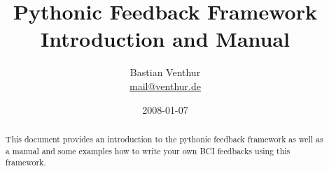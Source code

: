 \documentclass[a4paper,11pt,bibtotoc,idxtotoc]{scrartcl}
\title{Pythonic Feedback Framework\\Introduction and Manual}
\author{Bastian Venthur\\
  \href{mailto:mail@venthur.de}{mail@venthur.de}}
\date{2008-01-07}
\begin{document}
\maketitle

\begin{abstract}
This document provides an introduction to the pythonic feedback framework as well as a manual and some examples how to write your own BCI feedbacks using this framework.
\end{abstract}

\tableofcontents







\printindex
\end{document}
